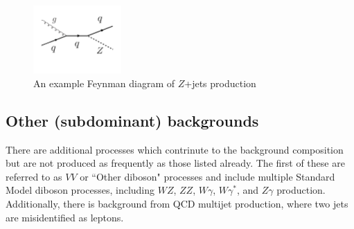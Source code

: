\begin{figure}[h!]
  \centering
  \captionsetup{justification=centering}

  \includegraphics[width=0.3\textwidth]{figures/Feyn_Zjets}
  \caption{An example Feynman diagram of $Z$+jets production}
  \label{fig:Zdiagram}
\end{figure}

\subsection{Other (subdominant) backgrounds}

There are additional processes which contrinute to the background composition but are not produced as frequently as those listed already. The first of these are referred to as $VV$ or ``Other diboson" processes and include multiple Standard Model diboson processes, including $WZ$, $ZZ$, $W\gamma$, $W\gamma^{*}$, and $Z\gamma$ production. Additionally, there is background from QCD multijet production, where two jets are misidentified as leptons. 

